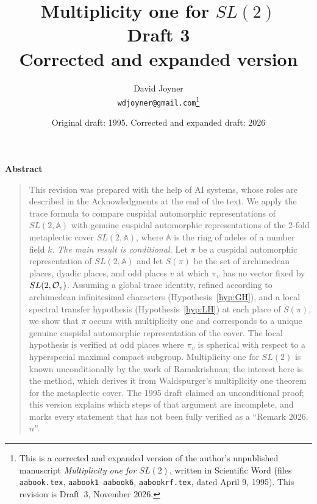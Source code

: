 \documentclass[12pt,letterpaper]{book}
\theoremstyle{plain}
\theoremstyle{definition}
\theoremstyle{remark}
\theoremstyle{remark}
\newenvironment{abstract}%
  {\begin{center}\bfseries Abstract\end{center}\begin{quote}}%
  {\end{quote}}
\begin{document}
\author{David Joyner\\[0.5ex] \normalsize\texttt{wdjoyner@gmail.com}\thanks{This is a corrected and expanded
version of the author's unpublished manuscript \emph{Multiplicity one for
$SL(2)$}, written in Scientific Word (files \texttt{aabook.tex},
\texttt{aabook1}--\texttt{aabook6}, \texttt{aabookrf.tex}, dated April 9,
1995). This revision is Draft~3, November 2026.}}
\title{Multiplicity one for $SL(2)$\\[2ex]
\large Draft 3\\[0.5ex] Corrected and expanded version}
\date{Original draft: 1995. Corrected and expanded draft: 2026}
\maketitle

\begin{abstract}
This revision was prepared with the help of AI systems, whose roles are
described in the Acknowledgments at the end of the text.
We apply the trace formula to compare cuspidal automorphic
representations of $SL(2,\mathbb{A})$ with genuine cuspidal
automorphic representations of the 2-fold metaplectic cover
$\overline{SL(2,\mathbb{A})}$, where $\mathbb{A}$ is the ring of adeles
of a number field $k$. \emph{The main result is conditional.}
Let $\pi$ be a cuspidal automorphic representation of $SL(2,\mathbb{A})$
and let $S(\pi)$ be the set of archimedean places, dyadic places, and
odd places $v$ at which $\pi_v$ has no vector fixed by $SL(2,{\cal O}_v)$.
Assuming a global trace identity, refined according to archimedean
infinitesimal characters (Hypothesis~\ref{hyp:GH}), and a local
spectral transfer hypothesis (Hypothesis~\ref{hyp:LH}) at each place of
$S(\pi)$, we show that $\pi$ occurs with multiplicity one and
corresponds to a unique genuine cuspidal automorphic representation of
the cover. The local hypothesis is verified at odd places where $\pi_v$
is spherical with respect to a hyperspecial maximal compact subgroup.
Multiplicity one for $SL(2)$ is known unconditionally by the work of
Ramakrishnan; the interest here is the method, which derives it from
Waldspurger's multiplicity one theorem for the metaplectic cover.
The 1995 draft claimed an unconditional proof; this version explains
which steps of that argument are incomplete, and marks every statement
that has not been fully verified as a ``Remark 2026.$n$''.
\end{abstract}

\tableofcontents
\end{document}
